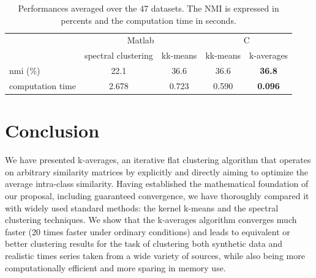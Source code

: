 \documentclass[natbib,smallextended]{svjour3}
\begin{document}
\begin{table}
\begin{center}
\caption{Performances averaged over the 47 datasets. The NMI is expressed in percents and the computation time in seconds.}
\label{tab:resultAverage}
\begin{tabular}{lcccc}
  & \multicolumn{2}{c}{Matlab} & \multicolumn{2}{c}{C} \\
  & spectral clustering & kk-means & kk-means & k-averages \\
\hline
nmi (\%) & 22.1 & 36.6 & 36.6 & \textbf{36.8} \\
computation time & 2.678 & 0.723 & 0.590 & \textbf{0.096} \\
\end{tabular}
\end{center}
\end{table}

\section{Conclusion}

We have presented k-averages, an iterative flat clustering algorithm that operates on arbitrary similarity matrices by explicitly and directly aiming to optimize the average intra-class similarity. Having established the mathematical foundation of our proposal, including guaranteed convergence, we have thoroughly compared it with widely used standard methods: the kernel k-means and the spectral clustering techniques. We show that the k-averages algorithm converges much faster (20 times faster under ordinary conditions) and leads to equivalent or better clustering results for the task of clustering both synthetic data and realistic times series taken from a wide variety of sources, while also being more computationally efficient and more sparing in memory use.


\end{document}
